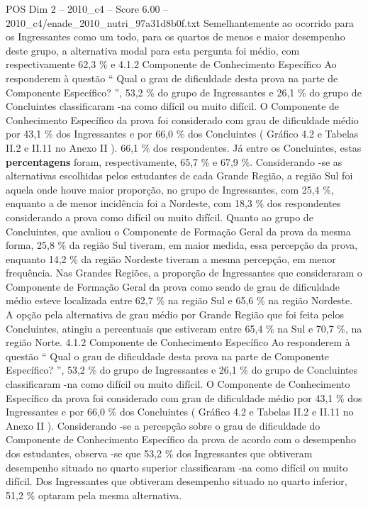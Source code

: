 \begin{textsample}{POS Dim 2 – 2010\_c4 – Score 6.00 – 2010\_c4/enade\_2010\_nutri\_97a31d8b0f.txt}
Semelhantemente ao ocorrido para os Ingressantes como um todo, para os quartos de menos e maior desempenho deste grupo, a alternativa modal para esta pergunta foi médio, com respectivamente 62,3 \% e 4.1.2 Componente de Conhecimento Específico Ao responderem à questão “ Qual o grau de dificuldade desta prova na parte de Componente Específico? ”, 53,2 \% do grupo de Ingressantes e 26,1 \% do grupo de Concluintes classificaram -na como difícil ou muito difícil.
O Componente de Conhecimento Específico da prova foi considerado com grau de dificuldade médio por 43,1 \% dos Ingressantes e por 66,0 \% dos Concluintes ( Gráfico 4.2 e Tabelas II.2 e II.11 no Anexo II ). 66,1 \% dos respondentes.
Já entre os Concluintes, estas \textbf{percentagens} foram, respectivamente, 65,7 \% e 67,9 \%.
Considerando -se as alternativas escolhidas pelos estudantes de cada Grande Região, a região Sul foi aquela onde houve maior proporção, no grupo de Ingressantes, com 25,4 \%, enquanto a de menor incidência foi a Nordeste, com 18,3 \% dos respondentes considerando a prova como difícil ou muito difícil.
Quanto ao grupo de Concluintes, que avaliou o Componente de Formação Geral da prova da mesma forma, 25,8 \% da região Sul tiveram, em maior medida, essa percepção da prova, enquanto 14,2 \% da região Nordeste tiveram a mesma percepção, em menor frequência.
Nas Grandes Regiões, a proporção de Ingressantes que consideraram o Componente de Formação Geral da prova como sendo de grau de dificuldade médio esteve localizada entre 62,7 \% na região Sul e 65,6 \% na região Nordeste.
A opção pela alternativa de grau médio por Grande Região que foi feita pelos Concluintes, atingiu a percentuais que estiveram entre 65,4 \% na Sul e 70,7 \%, na região Norte. 4.1.2 Componente de Conhecimento Específico Ao responderem à questão “ Qual o grau de dificuldade desta prova na parte de Componente Específico? ”, 53,2 \% do grupo de Ingressantes e 26,1 \% do grupo de Concluintes classificaram -na como difícil ou muito difícil.
O Componente de Conhecimento Específico da prova foi considerado com grau de dificuldade médio por 43,1 \% dos Ingressantes e por 66,0 \% dos Concluintes ( Gráfico 4.2 e Tabelas II.2 e II.11 no Anexo II ).
Considerando -se a percepção sobre o grau de dificuldade do Componente de Conhecimento Específico da prova de acordo com o desempenho dos estudantes, observa -se que 53,2 \% dos Ingressantes que obtiveram desempenho situado no quarto superior classificaram -na como difícil ou muito difícil.
Dos Ingressantes que obtiveram desempenho situado no quarto inferior, 51,2 \% optaram pela mesma alternativa.

\end{textsample}
